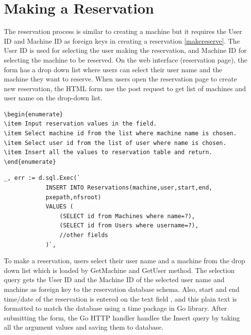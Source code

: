 \section*{Making a Reservation}
The reservation process is similar to creating a machine but it requires the User ID and Machine ID as foreign keys in creating a reservation \ref{makereserve}. The User ID is used for selecting the user making the reservation, and Machine ID for selecting the machine to be reserved. On the web interface (reservation page), the form has a drop down list where users can select their user name and the machine they want to reserve. When users open the reservation page to create new reservation, the HTML form use the post request to get list of machines and user name on the drop-down list.
\begin{lstlisting}[caption=Pseudocode, label=addreservation]
\begin{enumerate}
\item Input reservation values in the field.
\item Select machine id from the list where machine name is chosen.
\item Select user id from the list of user where name is chosen.
\item Insert all the values to reservation table and return.
\end{enumerate}
\end{lstlisting}
\begin{lstlisting}[caption=Storing Reservation details, label=Adding reservation]
	_, err := d.sql.Exec(`
			INSERT INTO Reservations(machine,user,start,end,
			pxepath,nfsroot)
			VALUES (
				(SELECT id from Machines where name=?),
				(SELECT id from Users where username=?),
				//other fields
			)`,
\end{lstlisting}

To make a reservation, users select their user name and a machine from the drop down list which is loaded by GetMachine and GetUser method. The selection query gets the User ID and the Machine ID of the selected user name and machine as foreign key to the reservation database schema. Also, start and end time/date of the reservation is entered on the text field , and this plain text is formatted to match the database using a time package in Go library. After submitting the form, the Go HTTP handler handles the Insert query by taking all the argument values and saving them to database. 
